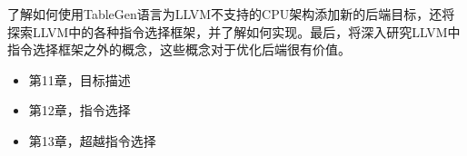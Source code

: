 了解如何使用TableGen语言为LLVM不支持的CPU架构添加新的后端目标，还将探索LLVM中的各种指令选择框架，并了解如何实现。最后，将深入研究LLVM中指令选择框架之外的概念，这些概念对于优化后端很有价值。

\begin{itemize}
\item
第11章，目标描述

\item
第12章，指令选择

\item
第13章，超越指令选择
\end{itemize}